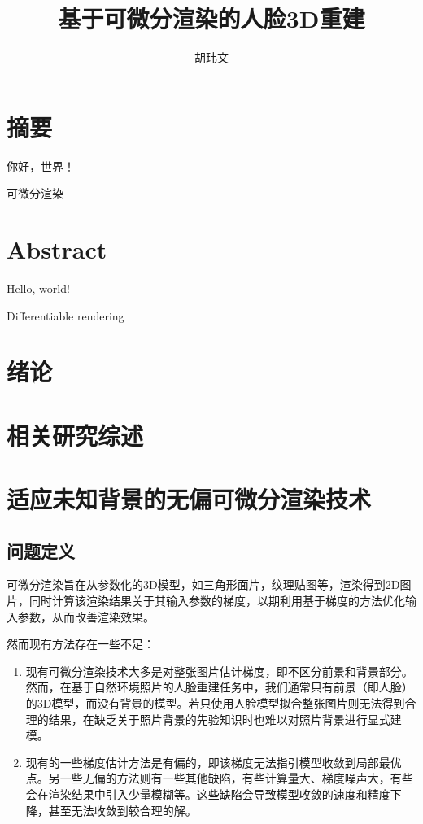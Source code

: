 \documentclass{scutmaster}
\title{基于可微分渲染的人脸3D重建}
\author{胡玮文}
\begin{document}
\maketitle
\maketitleEN
\nominationpage
\declareoforiginality

\frontmatter
\chapter*{摘要}

你好，世界！

 可微分渲染

\chapter*{Abstract}

Hello, world!

 Differentiable rendering

\tableofcontents

\listoffigures

\mainmatter
\chapter{绪论}

\chapter{相关研究综述}

\chapter{适应未知背景的无偏可微分渲染技术}

\section{问题定义}

可微分渲染旨在从参数化的3D模型，如三角形面片，纹理贴图等，渲染得到2D图片，同时计算该渲染结果关于其输入参数的梯度，以期利用基于梯度的方法优化输入参数，从而改善渲染效果。

然而现有方法存在一些不足：
\begin{enumerate}
    \item 现有可微分渲染技术大多是对整张图片估计梯度，即不区分前景和背景部分。然而，在基于自然环境照片的人脸重建任务中，我们通常只有前景（即人脸）的3D模型，而没有背景的模型。若只使用人脸模型拟合整张图片则无法得到合理的结果，在缺乏关于照片背景的先验知识时也难以对照片背景进行显式建模。
    \item 现有的一些梯度估计方法是有偏的，即该梯度无法指引模型收敛到局部最优点。另一些无偏的方法则有一些其他缺陷，有些计算量大、梯度噪声大，有些会在渲染结果中引入少量模糊等。这些缺陷会导致模型收敛的速度和精度下降，甚至无法收敛到较合理的解。
\end{enumerate}
\end{document}
